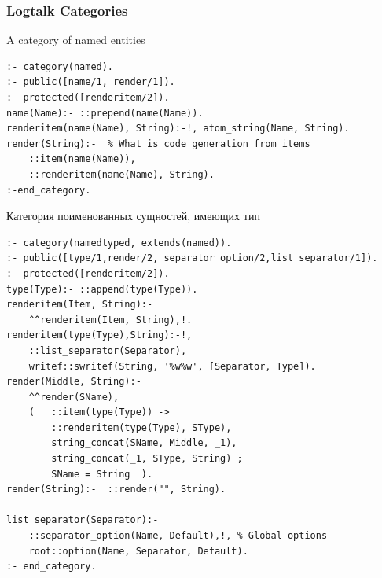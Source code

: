\documentclass[10pt]{beamer}
\begin{document}
\begin{frame}[fragile]
  \frametitle{Logtalk Categories}
  A category of named entities
\begin{verbatim}
:- category(named).
:- public([name/1, render/1]).
:- protected([renderitem/2]).
name(Name):- ::prepend(name(Name)).
renderitem(name(Name), String):-!, atom_string(Name, String).
render(String):-  % What is code generation from items
    ::item(name(Name)),
    ::renderitem(name(Name), String).
:-end_category.
\end{verbatim}
Категория поименованных сущностей, имеющих тип
\begin{verbatim}
:- category(namedtyped, extends(named)).
:- public([type/1,render/2, separator_option/2,list_separator/1]).
:- protected([renderitem/2]).
type(Type):- ::append(type(Type)).
renderitem(Item, String):-
    ^^renderitem(Item, String),!.
renderitem(type(Type),String):-!,
    ::list_separator(Separator),
    writef::swritef(String, '%w%w', [Separator, Type]).
render(Middle, String):-
    ^^render(SName),
    (   ::item(type(Type)) ->
        ::renderitem(type(Type), SType),
        string_concat(SName, Middle, _1),
        string_concat(_1, SType, String) ;
        SName = String  ).
render(String):-  ::render("", String).

list_separator(Separator):-
    ::separator_option(Name, Default),!, % Global options
    root::option(Name, Separator, Default).
:- end_category.

\end{verbatim}
\end{frame}
\end{document}
